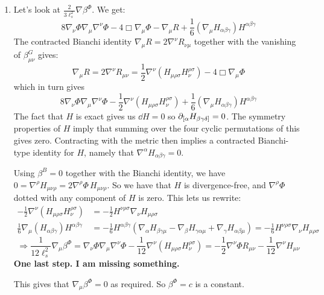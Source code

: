 \documentclass[11pt, class=article, crop=false]{standalone}
\begin{document}
\begin{enumerate}
	\item Let's look at $\frac{2}{3 \ell_s^2} \nabla \beta^\Phi$. We get:
	\[
		8 \nabla_\nu \Phi \nabla_\mu \nabla^{\nu} \Phi - 4 \Box \nabla_\mu \Phi - \nabla_\mu R + \frac16 (\nabla_\mu H_{\alpha \beta \gamma}) H^{\alpha \beta \gamma}
	\]
	The contracted Bianchi identity $\nabla_\mu R = 2 \nabla^\nu R_{\nu \mu}$ together with the vanishing of $\beta^G_{\mu \nu}$ gives:
	\[
		\nabla_\mu R = 2 \nabla^\nu R_{\mu \nu} = \frac12 \nabla^\nu (H_{\mu \rho \sigma} H_{\nu}^{\rho \sigma}) - 4 \Box \nabla_\mu \Phi
	\]
	which in turn gives
	\[
		8 \nabla_\nu \Phi \nabla_\mu \nabla^{\nu} \Phi -\frac12 \nabla^\nu (H_{\mu \rho \sigma} H_{\nu}^{\rho \sigma})  + \frac16 (\nabla_\mu H_{\alpha \beta \gamma}) H^{\alpha \beta \gamma}
	\]
	 The fact that $H$ is exact gives us $\dd H = 0$ so $\partial_{[\alpha} H_{\beta \gamma \delta]} = 0$. The symmetry properties of $H$ imply that summing over the four cyclic permutations of this gives zero. Contracting with the metric then implies a contracted Bianchi-type identity for $H$, namely that $\nabla^\alpha H_{\alpha \beta \gamma} = 0$.
	
	Using $\beta^B = 0$ together with the Bianchi identity, we have $0 = \nabla^\rho H_{\mu \nu \rho} = 2 \nabla^\rho \Phi \, H_{\mu \nu \rho}$. So we have that $H$ is divergence-free, and $\nabla^\rho \Phi$ dotted with any component of $H$ is zero. This lets us rewrite:
	\[
	\begin{aligned}
		-\frac12 \nabla^\nu (H_{\mu \rho \sigma} H_{\nu}^{\rho \sigma}) &= -\frac12 H^{\nu \rho \sigma} \nabla_{\nu} H_{\mu \rho \sigma}\\
	\frac16 \nabla_\mu (H_{\alpha \beta \gamma}) H^{\alpha \beta \gamma} &= -\frac16 H^{\alpha \beta \gamma} \left(\nabla_{\alpha} H_{\beta \gamma \mu} - \nabla_\beta H_{\gamma \alpha \mu} + \nabla_{\gamma} H_{\alpha \beta \mu} \right) = -\frac16 H^{\nu \rho \sigma} \nabla_\nu H_{\mu \rho \sigma}
	\end{aligned}
	\]
	\[
		\Rightarrow \frac{1}{12 \ell_s^2} \nabla_\mu \beta^\Phi = \nabla_\nu \Phi \nabla_\mu \nabla^{\nu} \Phi - \frac{1}{12} \nabla^\nu (H_{\mu \rho \sigma} H_{\nu}^{\rho \sigma}) = -\frac12 \nabla^\nu \Phi R_{\mu \nu} - \frac{1}{12} \nabla^\nu H_{\mu \nu}
	\]
	\textbf{One last step. I am missing something.}
	
	This gives that $\nabla_\mu \beta^\Phi = 0$ as required. So $\beta^\Phi = c$ is a constant.
	

\end{enumerate}
\end{document}
